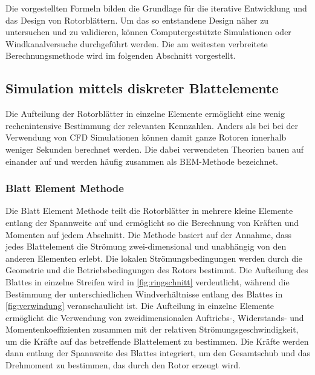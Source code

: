 Die vorgestellten Formeln bilden die Grundlage für die iterative Entwicklung und das Design von Rotorblättern. Um das so entstandene Design näher zu untersuchen und zu validieren, können Computergestützte Simulationen oder Windkanalversuche durchgeführt werden. Die am weitesten verbreitete Berechnungsmethode wird im folgenden Abschnitt vorgestellt.

\subsection{Simulation mittels diskreter Blattelemente}
Die Aufteilung der Rotorblätter in einzelne Elemente ermöglicht eine wenig rechenintensive Bestimmung der relevanten Kennzahlen. Anders als bei bei der Verwendung von CFD Simulationen können damit ganze Rotoren innerhalb weniger Sekunden berechnet werden.
Die dabei verwendeten Theorien bauen auf einander auf und werden häufig zusammen als BEM-Methode bezeichnet.

\subsubsection{Blatt Element Methode}
Die Blatt Element Methode teilt die Rotorblätter in mehrere kleine Elemente entlang der Spannweite auf und ermöglicht so die Berechnung von Kräften und Momenten auf jedem Abschnitt.
Die Methode basiert auf der Annahme, dass jedes Blattelement die Strömung zwei-dimensional und unabhängig von den anderen Elementen erlebt. Die lokalen Strömungsbedingungen werden durch die Geometrie und die Betriebsbedingungen des Rotors bestimmt. \cite{branlard_wind_2017} Die Aufteilung des Blattes in einzelne Streifen wird in \cref{fig:ringschnitt} verdeutlicht, während die Bestimmung der unterschiedlichen Windverhältnisse entlang des Blattes in \cref{fig:verwindung} veranschaulicht ist.
Die Aufteilung in einzelne Elemente ermöglicht die Verwendung von zweidimensionalen Auftriebs-, Widerstands- und Momentenkoeffizienten zusammen mit der relativen Strömungsgeschwindigkeit, um die Kräfte auf das betreffende Blattelement zu bestimmen.
Die Kräfte werden dann entlang der Spannweite des Blattes integriert, um den Gesamtschub und das Drehmoment zu bestimmen, das durch den Rotor erzeugt wird.

